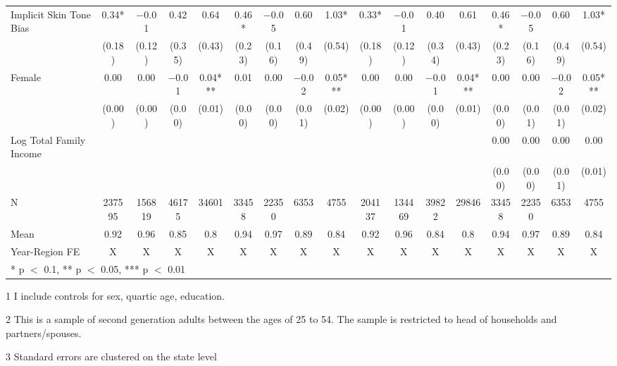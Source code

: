 \begin{landscape}
\begin{table}[!h]
{\begin{threeparttable}
\begin{tabular}[t]{lcccccccccccccccc}
\midrule
Implicit Skin Tone Bias & \num{0.34}* & \num{-0.01} & \num{0.42} & \num{0.64} & \num{0.46}* & \num{-0.05} & \num{0.60} & \num{1.03}* & \num{0.33}* & \num{-0.01} & \num{0.40} & \num{0.61} & \num{0.46}* & \num{-0.05} & \num{0.60} & \num{1.03}*\\
 & (\num{0.18}) & (\num{0.12}) & (\num{0.35}) & (\num{0.43}) & (\num{0.23}) & (\num{0.16}) & (\num{0.49}) & (\num{0.54}) & (\num{0.18}) & (\num{0.12}) & (\num{0.34}) & (\num{0.43}) & (\num{0.23}) & (\num{0.16}) & (\num{0.49}) & (\num{0.54})\\
Female & \num{0.00} & \num{0.00} & \num{-0.01} & \num{0.04}*** & \num{0.01} & \num{0.00} & \num{-0.02} & \num{0.05}*** & \num{0.00} & \num{0.00} & \num{-0.01} & \num{0.04}*** & \num{0.00} & \num{0.00} & \num{-0.02} & \num{0.05}***\\
 & (\num{0.00}) & (\num{0.00}) & (\num{0.00}) & (\num{0.01}) & (\num{0.00}) & (\num{0.00}) & (\num{0.01}) & (\num{0.02}) & (\num{0.00}) & (\num{0.00}) & (\num{0.00}) & (\num{0.01}) & (\num{0.00}) & (\num{0.01}) & (\num{0.01}) & (\num{0.02})\\
Log Total Family Income &  &  &  &  &  &  &  &  &  &  &  &  & \num{0.00} & \num{0.00} & \num{0.00} & \num{0.00}\\
 &  &  &  &  &  &  &  &  &  &  &  &  & (\num{0.00}) & (\num{0.00}) & (\num{0.01}) & (\num{0.01})\\
\midrule
N & \num{237595} & \num{156819} & \num{46175} & \num{34601} & \num{33458} & \num{22350} & \num{6353} & \num{4755} & \num{204137} & \num{134469} & \num{39822} & \num{29846} & \num{33458} & \num{22350} & \num{6353} & \num{4755}\\
Mean & \num{0.92} & \num{0.96} & \num{0.85} & \num{0.8} & \num{0.94} & \num{0.97} & \num{0.89} & \num{0.84} & \num{0.92} & \num{0.96} & \num{0.84} & \num{0.8} & \num{0.94} & \num{0.97} & \num{0.89} & \num{0.84}\\
Year-Region FE & X & X & X & X & X & X & X & X & X & X & X & X & X & X & X & X\\
\bottomrule
\multicolumn{17}{l}{\rule{0pt}{1em}* p $<$ 0.1, ** p $<$ 0.05, *** p $<$ 0.01}\\
\end{tabular}
\begin{tablenotes}
\item[1] I include controls for sex, quartic age, education.
\item[2] This is a sample of second generation adults between the ages of 25 to 54. The sample is restricted to head of households and partners/spouses.
\item[3] Standard errors are clustered on the state level
\end{tablenotes}
\end{threeparttable}}
\end{table}
\end{landscape}
